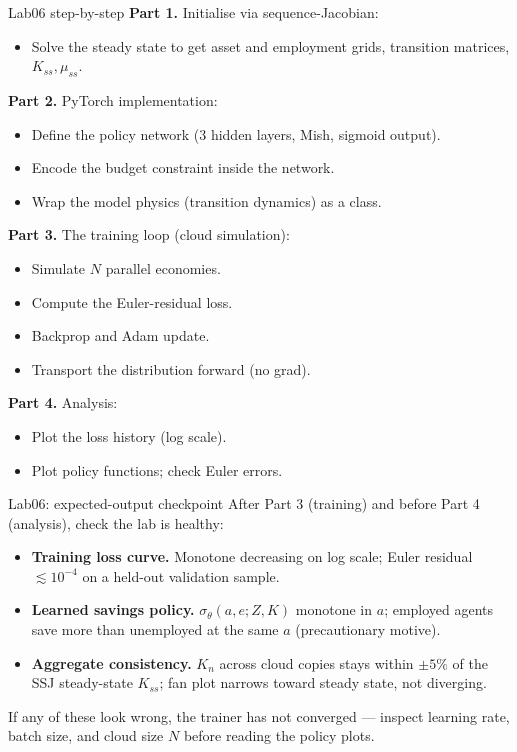 \begin{frame}{Lab06 step-by-step}
\textbf{Part 1.} Initialise via sequence-Jacobian:
\begin{itemize}
\item Solve the steady state to get asset and employment grids, transition matrices, $K_{ss}, \mu_{ss}$.
\end{itemize}
\medskip

\textbf{Part 2.} PyTorch implementation:
\begin{itemize}
\item Define the policy network (3 hidden layers, Mish, sigmoid output).
\item Encode the budget constraint inside the network.
\item Wrap the model physics (transition dynamics) as a class.
\end{itemize}
\medskip

\textbf{Part 3.} The training loop (cloud simulation):
\begin{itemize}
\item Simulate $N$ parallel economies.
\item Compute the Euler-residual loss.
\item Backprop and Adam update.
\item Transport the distribution forward (no grad).
\end{itemize}
\medskip

\textbf{Part 4.} Analysis:
\begin{itemize}
\item Plot the loss history (log scale).
\item Plot policy functions; check Euler errors.
\end{itemize}
\end{frame}

\begin{frame}{Lab06: expected-output checkpoint}
After Part 3 (training) and before Part 4 (analysis), check the lab is healthy:
\medskip
\begin{itemize}
\item \textbf{Training loss curve.} Monotone decreasing on log scale; Euler residual $\lesssim 10^{-4}$ on a held-out validation sample.
\medskip
\item \textbf{Learned savings policy.} $\sigma_\theta(a, e; Z, K)$ monotone in $a$; employed agents save more than unemployed at the same $a$ (precautionary motive).
\medskip
\item \textbf{Aggregate consistency.} $K_n$ across cloud copies stays within $\pm 5\%$ of the SSJ steady-state $K_{ss}$; fan plot narrows toward steady state, not diverging.
\end{itemize}
\medskip
If any of these look wrong, the trainer has not converged --- inspect learning rate, batch size, and cloud size $N$ before reading the policy plots.
\end{frame}

